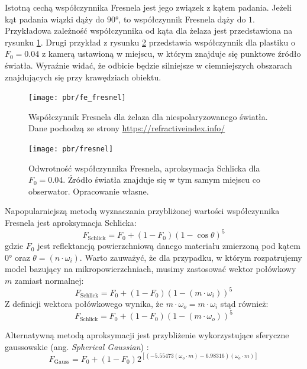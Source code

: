 \documentclass[../main.tex]{subfiles}
\begin{document}
Istotną cechą współczynnika Fresnela jest jego związek z kątem padania. Jeżeli kąt padania wiązki dąży do $\ang{90}$, to współczynnik Fresnela dąży do $1$. Przykładowa zależność współczynnika od kąta dla żelaza jest przedstawiona na rysunku \ref{fig:fe_fresnel}. Drugi przykład z rysunku \ref{fig:schlick_fresnel} przedstawia współczynnik dla plastiku o $F_0 = 0.04$ z kamerą ustawioną w miejscu, w którym znajduje się punktowe źródło światła. Wyraźnie widać, że odbicie będzie silniejsze w ciemniejszych obszarach znajdujących się przy krawędziach obiektu.

\begin{figure}[ht]
    \centering
    \texttt{[image: pbr/fe\_fresnel]}
    \caption{Współczynnik Fresnela dla żelaza dla niespolaryzowanego światła. Dane pochodzą ze strony \url{https://refractiveindex.info/}}
    \label{fig:fe_fresnel}
\end{figure}

\begin{figure}[h]
    \centering
    \texttt{[image: pbr/fresnel]}
    \caption{Odwrotność współczynnika Fresnela, aproksymacja Schlicka dla $F_0 = 0.04$. Źródło światła znajduje się w tym samym miejscu co obserwator. Opracowanie własne.}
    \label{fig:schlick_fresnel}
\end{figure}

Napopularniejszą metodą wyznaczania przybliżonej wartości współczynnika Fresnela jest aproksymacja Schlicka:
\begin{equation}
    F_{\text{Schlick}} = F_0 + (1-F_0)(1-\cos\theta)^5
\end{equation}
\noindent gdzie $F_0$ jest reflektancją powierzchniową danego materiału zmierzoną pod kątem $\ang{0}$ oraz $\theta = (n \cdot \omega_i)$. Warto zauważyć, że dla przypadku, w którym rozpatrujemy model bazujący na mikropowierzchniach, musimy zastosować wektor połówkowy $m$ zamiast normalnej:
\begin{equation}
    F_{\text{Schlick}} = F_0 + (1-F_0)\left(
        1 - \left(
            m \cdot \omega_i
        \right)
    \right)^5
\label{eq:pbr_schlick_half}
\end{equation}
\noindent Z definicji wektora połówkowego wynika, że $m \cdot \omega_o = m \cdot \omega_i$ stąd również:
\begin{equation}
F_{\text{Schlick}} = F_0 + (1-F_0)(1 - (m \cdot \omega_o))^5
\end{equation}

Alternatywną metodą aproksymacji jest przybliżenie wykorzystujące sferyczne gaussowskie (ang. \textit{Spherical Gaussian}) \cite{pbr_ue4,SphericalGaussianLegarde}:
\begin{equation}
    F_{\text{Gauss}} = F_0 +(1−F_0) 2^{\left[
        \left(
            −5.55473\left(\omega_o \cdot m\right)−6.98316
        \right) 
        (\omega_o \cdot m)
  \right]}
\end{equation}
\end{document}
